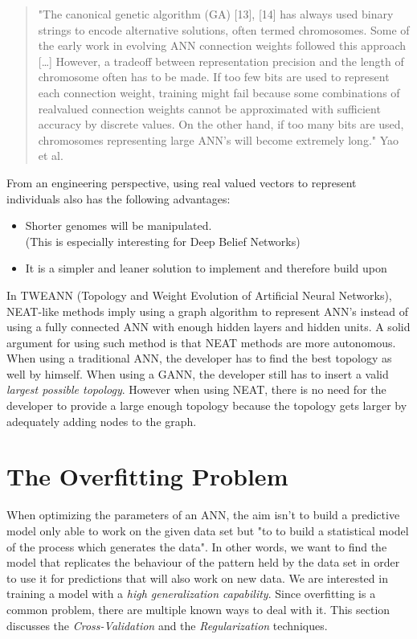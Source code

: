 \documentclass[a4paper,12pt, oneside]{memoir}
\begin{document}
\begin{quotation}
"The canonical genetic algorithm (GA) [13], [14] has always used binary strings to encode alternative solutions, often termed chromosomes. Some of the early work in evolving ANN connection weights followed this approach [\dots] However, a tradeoff between representation precision and the length of chromosome often has to be made. If too few bits are used to represent each connection weight, training might fail because some combinations of realvalued connection weights cannot be approximated with sufficient accuracy by discrete values. On the other hand, if too many bits are used, chromosomes representing large ANN’s will become extremely long." Yao et al.\cite{yao-1999}
\label{quote-yao-binary-encoding}
\end{quotation}

From an engineering perspective, using real valued vectors to represent individuals also has the following advantages:

\begin{itemize}
  \setlength\itemsep{0.001em}
  \item Shorter genomes will be manipulated. \\ 
    (This is especially interesting for Deep Belief Networks)
  \item It is a simpler and leaner solution to implement and therefore build upon
\end{itemize}

In TWEANN (Topology and Weight Evolution of Artificial Neural Networks), NEAT-like methods\cite{stanley-2002} imply using a graph algorithm to represent ANN's instead of using a fully connected ANN with enough hidden layers and hidden units. A solid argument for using such method is that NEAT methods are more autonomous. When using a traditional ANN, the developer has to find the best topology as well by himself. When using a GANN, the developer still has to insert a valid \textit{largest possible topology}. However when using NEAT, there is no need for the developer to provide a large enough topology because the topology gets larger by adequately adding nodes to the graph.

\section{The Overfitting Problem}
\label{section-the-overfitting-problem}

When optimizing the parameters of an ANN, the aim isn't to build a predictive model only able to work on the given data set but "to to build a statistical model of the process which generates the data"\cite{bishop-1995}. In other words, we want to find the model that replicates the behaviour of the pattern held by the data set in order to use it for predictions that will also work on new data. We are interested in training a model with a \textit{high generalization capability}. Since overfitting is a common problem, there are multiple known ways to deal with it. This section discusses the \textit{Cross-Validation} and the \textit{Regularization} techniques.
\end{document}
